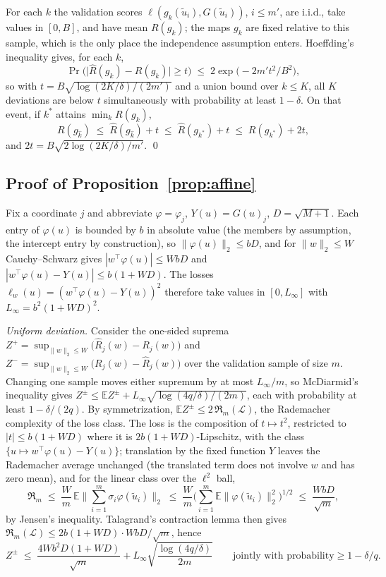 For each $k$ the validation scores $\ell(g_k(\tilde u_i),G(\tilde u_i))$,
$i\le m'$, are i.i.d., take values in $[0,B]$, and have mean $R(g_k)$; the
maps $g_k$ are fixed relative to this sample, which is the only place the
independence assumption enters. Hoeffding's inequality gives, for each $k$,
\[
\Pr\Big(\big|\widehat R(g_k)-R(g_k)\big|\ge t\Big)\;\le\;
2\exp\!\big(-2m't^2/B^2\big),
\]
so with $t=B\sqrt{\log(2K/\delta)/(2m')}$ and a union bound over $k\le K$,
all $K$ deviations are below $t$ simultaneously with probability at least
$1-\delta$. On that event, if $k^\ast$ attains $\min_k R(g_k)$,
\[
R(g_{\widehat k})\;\le\;\widehat R(g_{\widehat k})+t\;\le\;
\widehat R(g_{k^\ast})+t\;\le\;R(g_{k^\ast})+2t,
\]
and $2t=B\sqrt{2\log(2K/\delta)/m'}$. \qed

\subsection{Proof of Proposition~\ref{prop:affine}}
\label{proof:prop:affine}

Fix a coordinate $j$ and abbreviate $\varphi=\varphi_j$, $Y(u)=G(u)_j$,
$D=\sqrt{M+1}$. Each entry of $\varphi(u)$ is bounded by $b$ in absolute
value (the members by assumption, the intercept entry by construction), so
$\|\varphi(u)\|_2\le bD$, and for $\|w\|_2\le W$ Cauchy--Schwarz gives
$|w^\top\varphi(u)|\le WbD$ and
$|w^\top\varphi(u)-Y(u)|\le b(1+WD)$. The losses
$\ell_w(u)=(w^\top\varphi(u)-Y(u))^2$ therefore take values in
$[0,L_\infty]$ with $L_\infty=b^2(1+WD)^2$.

\emph{Uniform deviation.} Consider the one-sided suprema
$Z^{+}=\sup_{\|w\|_2\le W}\big(\widehat R_j(w)-R_j(w)\big)$ and
$Z^{-}=\sup_{\|w\|_2\le W}\big(R_j(w)-\widehat R_j(w)\big)$ over the
validation sample of size $m$. Changing one sample moves either supremum by
at most $L_\infty/m$, so McDiarmid's inequality gives
$Z^{\pm}\le\mathbb E Z^{\pm}+L_\infty\sqrt{\log(4q/\delta)/(2m)}$, each with
probability at least $1-\delta/(2q)$. By
symmetrization, $\mathbb E Z^{\pm}\le 2\,\mathfrak R_m(\mathcal L)$, the
Rademacher complexity of the loss class. The loss is the composition of $t\mapsto t^2$,
restricted to $|t|\le b(1+WD)$ where it is $2b(1+WD)$-Lipschitz, with the
class $\{u\mapsto w^\top\varphi(u)-Y(u)\}$; translation by the fixed function
$Y$ leaves the Rademacher average unchanged (the translated term does not
involve $w$ and has zero mean), and for the linear class over the
$\ell^2$ ball,
\[
\mathfrak R_m\;\le\;\frac{W}{m}\,
\mathbb E\Big\|\sum_{i=1}^m\sigma_i\varphi(\tilde u_i)\Big\|_2\;\le\;
\frac{W}{m}\Big(\sum_{i=1}^m\mathbb E\|\varphi(\tilde u_i)\|_2^2\Big)^{1/2}
\;\le\;\frac{WbD}{\sqrt m},
\]
by Jensen's inequality. Talagrand's contraction lemma then gives
$\mathfrak R_m(\mathcal L)\le 2b(1+WD)\cdot WbD/\sqrt m$, hence
\[
Z^{\pm}\;\le\;\frac{4Wb^2D(1+WD)}{\sqrt m}
+L_\infty\sqrt{\frac{\log(4q/\delta)}{2m}}
\qquad\text{jointly with probability}\ge 1-\delta/q .
\]

